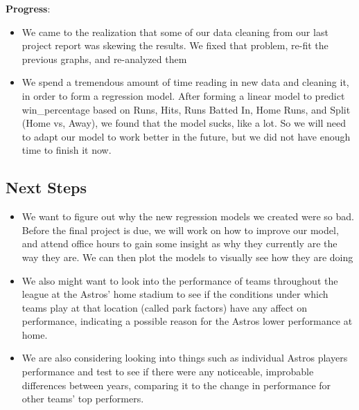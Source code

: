 \documentclass[
]{article}
\begin{document}
\textbf{Progress}:

\begin{itemize}
\item
  We came to the realization that some of our data cleaning from our
  last project report was skewing the results. We fixed that problem,
  re-fit the previous graphs, and re-analyzed them
\item
  We spend a tremendous amount of time reading in new data and cleaning
  it, in order to form a regression model. After forming a linear model
  to predict win\_percentage based on Runs, Hits, Runs Batted In, Home
  Runs, and Split (Home vs, Away), we found that the model sucks, like a
  lot. So we will need to adapt our model to work better in the future,
  but we did not have enough time to finish it now.
\end{itemize}

\hypertarget{next-steps}{%
\subsection{Next Steps}\label{next-steps}}

\begin{itemize}
\item
  We want to figure out why the new regression models we created were so
  bad. Before the final project is due, we will work on how to improve
  our model, and attend office hours to gain some insight as why they
  currently are the way they are. We can then plot the models to
  visually see how they are doing
\item
  We also might want to look into the performance of teams throughout
  the league at the Astros' home stadium to see if the conditions under
  which teams play at that location (called park factors) have any
  affect on performance, indicating a possible reason for the Astros
  lower performance at home.
\item
  We are also considering looking into things such as individual Astros
  players performance and test to see if there were any noticeable,
  improbable differences between years, comparing it to the change in
  performance for other teams' top performers.
\end{itemize}
\end{document}
